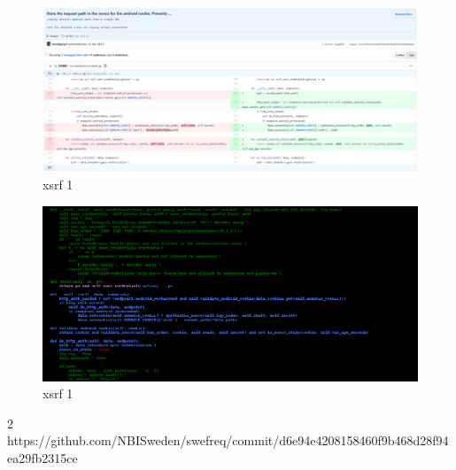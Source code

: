 \documentclass[
a4paper,
pagesize,
pdftex,
12pt,
twoside, %
BCOR=5mm, %
ngerman,
fleqn,
final,
]{scrartcl}
\begin{document}
\begin{figure}[h]
	\centering
	\includegraphics[width=\linewidth]{Images/xsrf1}
	\caption{xsrf 1}
	\label{fig:xsrf1}
\end{figure}
\begin{figure}[h]
	\centering
	\includegraphics[width=\linewidth]{Images/xsrf1r}
	\caption{xsrf 1}
	\label{fig:xsrf1r}
\end{figure}


2 https://github.com/NBISweden/swefreq/commit/d6e94e4208158460f9b468d28f94ea29fb2315ce
\end{document}
